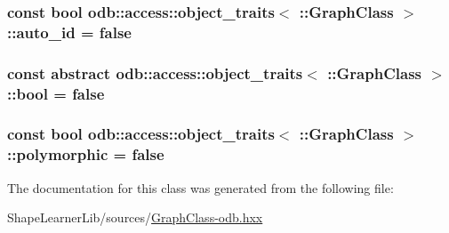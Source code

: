 \subsubsection[{auto\+\_\+id}]{\setlength{\rightskip}{0pt plus 5cm}const {\bf bool} odb\+::access\+::object\+\_\+traits$<$ \+::{\bf Graph\+Class} $>$\+::auto\+\_\+id = false\hspace{0.3cm}{\ttfamily [static]}}\label{classodb_1_1access_1_1object__traits_3_01_1_1_graph_class_01_4_a6793f8d458eec718fc1d0becd111635a}
\hypertarget{classodb_1_1access_1_1object__traits_3_01_1_1_graph_class_01_4_adb6d76b31575782f2c201eb3ab510e59}{}
\subsubsection[{bool}]{\setlength{\rightskip}{0pt plus 5cm}const abstract odb\+::access\+::object\+\_\+traits$<$ \+::{\bf Graph\+Class} $>$\+::bool = false\hspace{0.3cm}{\ttfamily [static]}}\label{classodb_1_1access_1_1object__traits_3_01_1_1_graph_class_01_4_adb6d76b31575782f2c201eb3ab510e59}
\hypertarget{classodb_1_1access_1_1object__traits_3_01_1_1_graph_class_01_4_ab98d6ff3bbe77868e4728ec80a75e787}{}
\subsubsection[{polymorphic}]{\setlength{\rightskip}{0pt plus 5cm}const {\bf bool} odb\+::access\+::object\+\_\+traits$<$ \+::{\bf Graph\+Class} $>$\+::polymorphic = false\hspace{0.3cm}{\ttfamily [static]}}\label{classodb_1_1access_1_1object__traits_3_01_1_1_graph_class_01_4_ab98d6ff3bbe77868e4728ec80a75e787}


The documentation for this class was generated from the following file\+:\begin{DoxyCompactItemize}
\item 
Shape\+Learner\+Lib/sources/\hyperlink{_graph_class-odb_8hxx}{Graph\+Class-\/odb.\+hxx}\end{DoxyCompactItemize}

